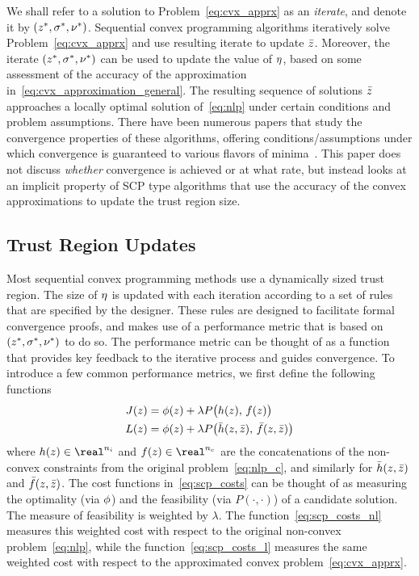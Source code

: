 \documentclass[letterpaper, 10 pt, conference]{ieeeconf}
\begin{document}
We shall refer to a solution to Problem~\eqref{eq:cvx_apprx} as an \textit{iterate}, and denote it by $(z^*,\sigma^*,\nu^*)$. Sequential convex programming algorithms iteratively solve Problem~\eqref{eq:cvx_apprx} and use resulting iterate to update $\bar{z}$. Moreover, the iterate $(z^*,\sigma^*,\nu^*)$ can be used to update the value of $\eta$, based on some assessment of the accuracy of the approximation in~\eqref{eq:cvx_approximation_general}. The resulting sequence of solutions $\bar{z}$ approaches a locally optimal solution of~\eqref{eq:nlp} under certain conditions and problem assumptions. There have been numerous papers that study the convergence properties of these algorithms, offering conditions/assumptions under which convergence is guaranteed to various flavors of minima~\cite{Mao2016a,Mao2018,Bonalli2019,Bonalli2019b}. This paper does not discuss \textit{whether} convergence is achieved or at what rate, but instead looks at an implicit property of SCP type algorithms that use the accuracy of the convex approximations to update the trust region size.

\subsection{Trust Region Updates}\label{subsec:tr_updates}

Most sequential convex programming methods use a dynamically sized trust region. The size of $\eta$ is updated with each iteration according to a set of rules that are specified by the designer. These rules are designed to facilitate formal convergence proofs, and makes use of a performance metric that is based on $(z^*,\sigma^*,\nu^*)$ to do so. The performance metric can be thought of as a function that provides key feedback to the iterative process and guides convergence. To introduce a few common performance metrics, we first define the following functions
\begin{subequations}\label{eq:scp_costs}
\begin{align}
J(z) &= \phi(z) + \lambda P\big( h(z),\,f(z) \big) \label{eq:scp_costs_nl}\\
L(z) &= \phi(z) + \lambda P\big( \bar{h}(z,\bar{z}),\,\bar{f}(z,\bar{z}) \big) \label{eq:scp_costs_l}
\end{align}
\end{subequations}
where $\fni(\z) \in \real^{n_i}$ and $\fne(\z)\in\real^{n_e}$ are the concatenations of the non-convex constraints from the original problem~\eqref{eq:nlp_c}, and similarly for $\bar{h}(z,\bar{z})$ and $\bar{f}(z,\bar{z})$. The cost functions in~\eqref{eq:scp_costs} can be thought of as measuring the optimality (via $\phi$) and the feasibility (via $P(\cdot,\cdot)$) of a candidate solution. The measure of feasibility is weighted by $\lambda$. The function~\eqref{eq:scp_costs_nl} measures this weighted cost with respect to the original non-convex problem~\eqref{eq:nlp}, while the function~\eqref{eq:scp_costs_l} measures the same weighted cost with respect to the approximated convex problem~\eqref{eq:cvx_apprx}. 
\end{document}
